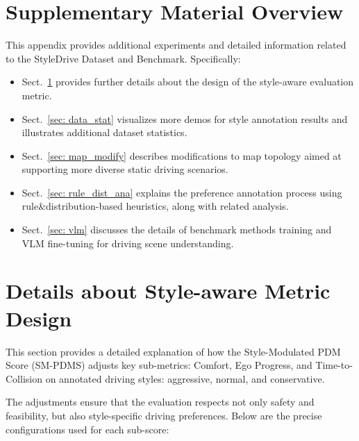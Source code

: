 \documentclass{article}
\begin{document}



% 

\newpage

\setcounter{section}{0}

\section*{Supplementary Material Overview}
This appendix provides additional experiments and detailed information related to the StyleDrive Dataset and Benchmark. Specifically:
\begin{itemize}[leftmargin=1em, topsep=0pt, itemsep=0.3em]
    \item Sect.~\ref{sec: metric} provides further details about the design of the style-aware evaluation metric.
    \item Sect.~\ref{sec: data_stat} visualizes more demos for style annotation results and illustrates additional dataset statistics.
    \item Sect.~\ref{sec: map_modify} describes modifications to map topology aimed at supporting more diverse static driving scenarios.
    \item Sect.~\ref{sec: rule_dist_ana} explains the preference annotation process using rule\&distribution-based heuristics, along with related analysis.
    \item Sect.~\ref{sec: vlm} discusses the details of benchmark methods training and VLM fine-tuning for driving scene understanding.
\end{itemize}

\section{Details about Style-aware Metric Design}\label{sec: metric}
This section provides a detailed explanation of how the Style-Modulated PDM Score (SM-PDMS) adjusts key sub-metrics: Comfort, Ego Progress, and Time-to-Collision on annotated driving styles: aggressive, normal, and conservative.

The adjustments ensure that the evaluation respects not only safety and feasibility, but also style-specific driving preferences. Below are the precise configurations used for each sub-score:
\end{document}
